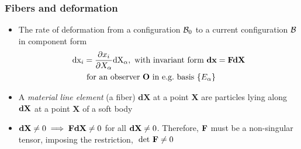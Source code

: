\begin{frame}
	\frametitle{Fibers and deformation}
	\begin{itemize}
		\item  The rate of deformation from a  configuration $\mathcal{B}_0$ to a current configuration $\mathcal{B}$ in component form
		\begin{align}
		\text{dx}_i &= \dfrac{\partial x_i}{\partial X_\alpha} \text{dX}_\alpha,
		\text{  with invariant form }
		\textbf{dx} = \textbf{FdX} \nonumber \\ %
		&\text{
			for an observer \textbf{O} in \eg basis }\{E_\alpha\} \nonumber
		\end{align}
		\item A \textit{material line element} (a fiber) $\textbf{dX}$ at a point \textbf{X}  are  particles lying along $\textbf{dX}$ at a point $\textbf{X}$ of a soft body
		\vspace{0.1in}
		\item $\textbf{dX} \neq 0 \implies \textbf{F} \textbf{dX} \neq 0$ for all  $\textbf{dX} \neq 0$. Therefore, $\textbf{F}$ 		must be a non-singular 	tensor, imposing the restriction, $\text{ det }\textbf{F} \neq 0$
	\end{itemize}
\end{frame}


